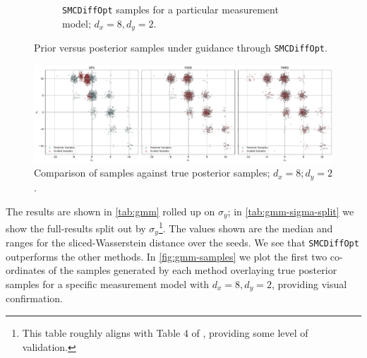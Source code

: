 \begin{figure}[t]
\begin{subfigure}[b]{0.48\textwidth}
      \caption{\texttt{SMCDiffOpt} samples for a particular measurement model; $d_x = 8, d_y = 2$.}
      \label{fig:gmm-smc-samples}
    \end{subfigure}
    \caption{Prior versus posterior samples under guidance through \texttt{SMCDiffOpt}.}
    \label{fig:gmm-prior-smc-samples}
\end{figure}

\begin{figure}[t]
    \centering
    \includegraphics[width=1\textwidth]{assets/gmm_samples.pdf}
    \caption{Comparison of samples against true posterior samples; $d_x = 8; d_y = 2$.}
    \label{fig:gmm-samples}
\end{figure}

The results are shown in \autoref{tab:gmm} rolled up on $\sigma_y$; in \autoref{tab:gmm-sigma-split} we
show the full-results split out by $\sigma_y$\footnote{This table roughly aligns with Table 4 of
\textcite{boysTweedieMomentProjected2023}, providing some level of validation.}. The values shown
are the median and ranges for the sliced-Wasserstein distance over the seeds.  We see
that \texttt{SMCDiffOpt} outperforms the other methods. In \autoref{fig:gmm-samples} we plot the
first two co-ordinates of the samples generated by each method overlaying true posterior samples for
a specific measurement model with $d_x = 8, d_y = 2$, providing visual confirmation.

